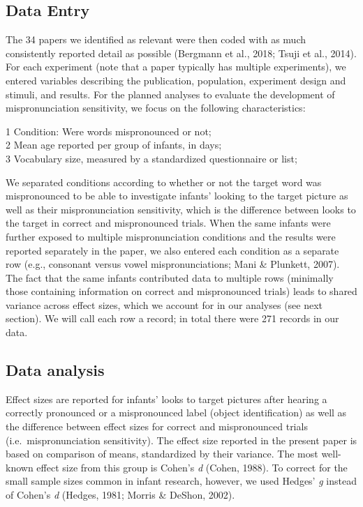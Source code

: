 \documentclass[man]{apa6}
\theoremstyle{definition}
\theoremstyle{definition}
\theoremstyle{definition}
\theoremstyle{remark}
\begin{document}
\subsection{Data Entry}\label{data-entry}

The 34 papers we identified as relevant were then coded with as much
consistently reported detail as possible (Bergmann et al., 2018; Tsuji
et al., 2014). For each experiment (note that a paper typically has
multiple experiments), we entered variables describing the publication,
population, experiment design and stimuli, and results. For the planned
analyses to evaluate the development of mispronunciation sensitivity, we
focus on the following characteristics:

1 Condition: Were words mispronounced or not;\\
2 Mean age reported per group of infants, in days;\\
3 Vocabulary size, measured by a standardized questionnaire or list;

We separated conditions according to whether or not the target word was
mispronounced to be able to investigate infants' looking to the target
picture as well as their mispronunciation sensitivity, which is the
difference between looks to the target in correct and mispronounced
trials. When the same infants were further exposed to multiple
mispronunciation conditions and the results were reported separately in
the paper, we also entered each condition as a separate row (e.g.,
consonant versus vowel mispronunciations; Mani \& Plunkett, 2007). The
fact that the same infants contributed data to multiple rows (minimally
those containing information on correct and mispronounced trials) leads
to shared variance across effect sizes, which we account for in our
analyses (see next section). We will call each row a record; in total
there were 271 records in our data.

\subsection{Data analysis}\label{data-analysis}

Effect sizes are reported for infants' looks to target pictures after
hearing a correctly pronounced or a mispronounced label (object
identification) as well as the difference between effect sizes for
correct and mispronounced trials (i.e.~mispronunciation sensitivity).
The effect size reported in the present paper is based on comparison of
means, standardized by their variance. The most well-known effect size
from this group is Cohen's \emph{d} (Cohen, 1988). To correct for the
small sample sizes common in infant research, however, we used Hedges'
\emph{g} instead of Cohen's \emph{d} (Hedges, 1981; Morris \& DeShon,
2002).
\end{document}
